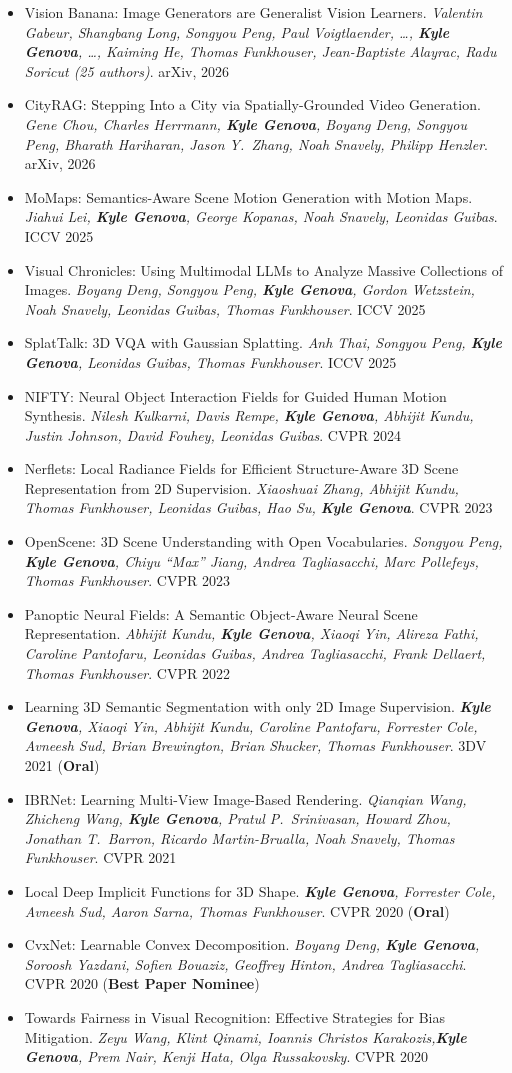 \documentclass[10.5pt]{article}
\newcommand{\me}{\textbf{Kyle Genova}}
\newcommand{\pub}[3]{\item #1. \textit{#2}. #3}
\begin{document}
\begin{itemize}\small
  \pub{Vision Banana: Image Generators are Generalist Vision Learners}{Valentin Gabeur, Shangbang Long, Songyou Peng, Paul Voigtlaender, \ldots, \me, \ldots, Kaiming He, Thomas Funkhouser, Jean-Baptiste Alayrac, Radu Soricut (25 authors)}{arXiv, 2026}
  \pub{CityRAG: Stepping Into a City via Spatially-Grounded Video Generation}{Gene Chou, Charles Herrmann, \me, Boyang Deng, Songyou Peng, Bharath Hariharan, Jason Y.\ Zhang, Noah Snavely, Philipp Henzler}{arXiv, 2026}
  \pub{MoMaps: Semantics-Aware Scene Motion Generation with Motion Maps}{Jiahui Lei, \me, George Kopanas, Noah Snavely, Leonidas Guibas}{ICCV 2025}
  \pub{Visual Chronicles: Using Multimodal LLMs to Analyze Massive Collections of Images}{Boyang Deng, Songyou Peng, \me, Gordon Wetzstein, Noah Snavely, Leonidas Guibas, Thomas Funkhouser}{ICCV 2025}
  \pub{SplatTalk: 3D VQA with Gaussian Splatting}{Anh Thai, Songyou Peng, \me, Leonidas Guibas, Thomas Funkhouser}{ICCV 2025}
  \pub{NIFTY: Neural Object Interaction Fields for Guided Human Motion Synthesis}{Nilesh Kulkarni, Davis Rempe, \me, Abhijit Kundu, Justin Johnson, David Fouhey, Leonidas Guibas}{CVPR 2024}
  \pub{Nerflets: Local Radiance Fields for Efficient Structure-Aware 3D Scene Representation from 2D Supervision}{Xiaoshuai Zhang, Abhijit Kundu, Thomas Funkhouser, Leonidas Guibas, Hao Su, \me}{CVPR 2023}
  \pub{OpenScene: 3D Scene Understanding with Open Vocabularies}{Songyou Peng, \me, Chiyu ``Max'' Jiang, Andrea Tagliasacchi, Marc Pollefeys, Thomas Funkhouser}{CVPR 2023}
  \pub{Panoptic Neural Fields: A Semantic Object-Aware Neural Scene Representation}{Abhijit Kundu, \me, Xiaoqi Yin, Alireza Fathi, Caroline Pantofaru, Leonidas Guibas, Andrea Tagliasacchi, Frank Dellaert, Thomas Funkhouser}{CVPR 2022}
  \pub{Learning 3D Semantic Segmentation with only 2D Image Supervision}{\me, Xiaoqi Yin, Abhijit Kundu, Caroline Pantofaru, Forrester Cole, Avneesh Sud, Brian Brewington, Brian Shucker, Thomas Funkhouser}{3DV 2021 (\textbf{Oral})}
  \pub{IBRNet: Learning Multi-View Image-Based Rendering}{Qianqian Wang, Zhicheng Wang, \me, Pratul P.\ Srinivasan, Howard Zhou, Jonathan T.\ Barron, Ricardo Martin-Brualla, Noah Snavely, Thomas Funkhouser}{CVPR 2021}
  \pub{Local Deep Implicit Functions for 3D Shape}{\me, Forrester Cole, Avneesh Sud, Aaron Sarna, Thomas Funkhouser}{CVPR 2020 (\textbf{Oral})}
  \pub{CvxNet: Learnable Convex Decomposition}{Boyang Deng, \me, Soroosh Yazdani, Sofien Bouaziz, Geoffrey Hinton, Andrea Tagliasacchi}{CVPR 2020 (\textbf{Best Paper Nominee})}
  \pub{Towards Fairness in Visual Recognition: Effective Strategies for Bias Mitigation}{Zeyu Wang, Klint Qinami, Ioannis Christos Karakozis,\me, Prem Nair, Kenji Hata, Olga Russakovsky}{CVPR 2020}

\end{itemize}
\end{document}
